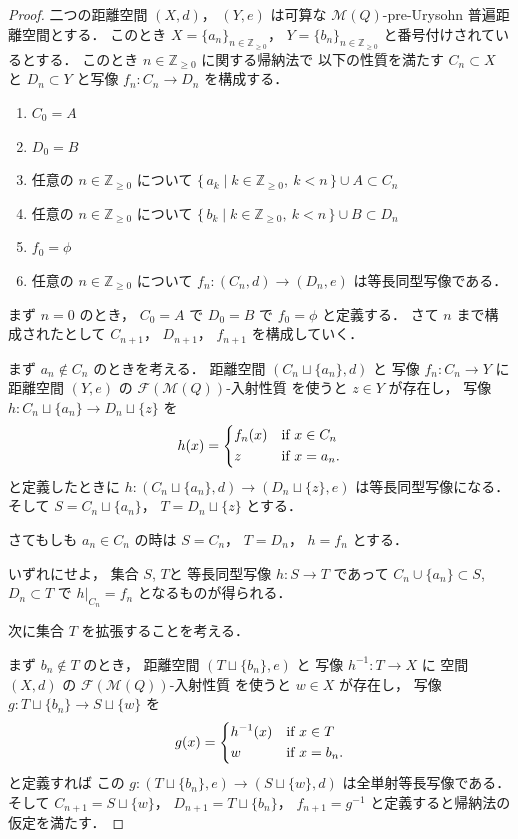 \documentclass[leqno, 12pt]{jsarticle}
\newcommand{\zz}{\mathbb{Z}}
\newcommand{\yozz}[1]{\zz_{\ge #1}}
\newcommand{\Met}[1]{\mathscr{M}(#1)}
\newcommand{\FinitePart}[1]{\mathscr{F}(#1)}
\newcommand{\FinMet}[1]{\FinitePart{\Met{#1}}}
\newcommand{\restr}[2]{#1|_{#2}}
\begin{document}
\begin{proof}
二つの距離空間
$(X, d)$，
$(Y, e)$
は可算な
$\Met{Q}$-pre-Urysohn
普遍距離空間とする．
このとき
$X=\{a_{n}\}_{n\in \yozz{0}}$，
$Y=\{b_{n}\}_{n\in \yozz{0}}$
と番号付けされているとする．
このとき
$n\in \yozz{0}$
に関する帰納法で
以下の性質を満たす
$C_{n}\subset X$%
と%
$D_{n}\subset Y$
と写像
$f_{n}\colon  C_{n}\to D_{n}$
を構成する．
\begin{enumerate}[label=\textup{(\arabic*)}]
\item
$C_{0}=A$
\item
$D_{0}=B$
\item
任意の
$n\in \yozz{0}$
について
$\{\,a_k\mid k\in\yozz{0},\ k<n\,\}\cup A\subset C_{n}$
\item
任意の%
$n\in \yozz{0}$%
について
$\{\,b_k\mid k\in\yozz{0},\ k<n\,\}\cup B\subset D_{n}$
\item
$f_0=\phi$
\item
任意の
$n\in \yozz{0}$
について
$f_{n}\colon  (C_{n}, d)\to (D_{n}, e)$
は等長同型写像である．
\end{enumerate}
まず
$n=0$
のとき，
$C_{0}=A$
で
$D_{0}=B$
で
$f_{0}=\phi$
と定義する．
さて
$n$
まで構成されたとして
 $C_{n+1}$，
 $D_{n+1}$，
 $f_{n+1}$
 を構成していく．

まず
$a_{n}\not\in C_{n}$
のときを考える．
距離空間
$(C_{n}\sqcup\{a_{n}\}, d)$
と
写像
$f_{n}\colon  C_n\to Y$
に
距離空間
$(Y, e)$
の
$\FinMet{Q}$-入射性質
を使うと
$z\in Y$%
が存在し，
写像
$h\colon  C_{n}\sqcup \{a_{n}\}\to D_{n}\sqcup \{z\}$%
を
\[
h(x)=
\begin{dcases}
	f_{n}(x) & \text{if
$x\in C_{n}$%
}\\
	z & \text{if
$x=a_{n}$%
}.
\end{dcases}
\]
と定義したときに
$h\colon  (C_{n}\sqcup \{a_{n}\}, d)\to (D_{n}\sqcup \{z\}, e)$
は等長同型写像になる．
そして
$S=C_{n}\sqcup \{a_{n}\}$，
$T=D_{n}\sqcup\{z\}$%
とする．

さてもしも
$a_{n}\in C_{n}$
の時は
$S=C_{n}$，
$T=D_{n}$，
$h=f_{n}$
とする．

いずれにせよ，
集合
$S$, 
$T$と
等長同型写像
$h\colon S\to T$
であって
$C_{n}\cup \{a_{n}\}\subset S$, 
$D_{n}\subset T$
で
$\restr{h}{C_{n}}=f_{n}$
となるものが得られる．



次に集合
$T$
を拡張することを考える．

まず
$b_{n}\not\in T$
のとき，
距離空間
$(T\sqcup\{b_{n}\}, e)$
と
写像
$h^{-1}\colon  T\to X$%
に
空間
$(X, d)$
の
$\FinMet{Q}$-入射性質
を使うと
$w\in X$
が存在し，
写像
$g: T\sqcup\{b_{n}\}\to S\sqcup\{w\}$%
を
\[
g(x)=
\begin{dcases}
	h^{-1}(x) & \text{if
$x\in T$%
}\\
	w & \text{if
$x=b_{n}$%
}.
\end{dcases}
\]
と定義すれば
この
$g\colon  (T\sqcup \{b_{n}\}, e)\to (S\sqcup\{w\}, d)$%
は全単射等長写像である．
そして
$C_{n+1}=S\sqcup \{w\}$，
$D_{n+1}=T\sqcup \{b_{n}\}$，
$f_{n+1}=g^{-1}$
と定義すると帰納法の仮定を満たす．



\end{proof}
\end{document}
